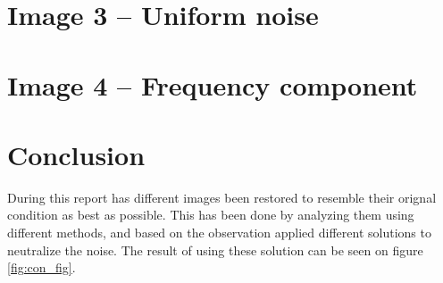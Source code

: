 \documentclass[11pt]{article}
\begin{document}
\newpage
\section{Image 3 -- Uniform noise}


\newpage
\section{Image 4 -- Frequency component}


\section{Conclusion}
During this report has different images been restored to resemble their orignal condition as best as possible. This has been done by analyzing them using different methods, and based on the observation applied different solutions to neutralize the noise. The result of using these solution can be seen on figure \ref{fig:con_fig}.
\end{document}
